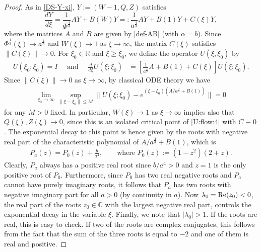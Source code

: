 \documentclass{article}%
\renewcommand{\Re}{{\rm Re}}
\newcommand{\alp}{\alpha}
\newcommand{\lam}{\lambda}
\newcommand{\R}{\mathbb{R}}
\newcommand{\C}{\mathbb{C}}
\begin{document}
\begin{proof}
\medskip

As in \eqref{DS-Y-xi}, $Y := (W-1,Q,Z)$ satisfies
\begin{equation}\label{DS-Y-xi4}
\frac{dY}{d\xi} =\frac{1}{\Phi^{\frac{4}{3}}} AY + B(W)Y 
=: \frac{1}{a^{\frac{4}{3}}} AY + B(1)Y+ C(\xi)Y,
\end{equation}
where the matrices $A$ and $B$ are given by \eqref{def-AB} (with $\alp=b$). Since $\Phi^{\frac{4}{3}}(\xi) \to a^{\frac{4}{3}}$ and $W(\xi) \to 1$ as $\xi\to\infty$, the matrix $C(\xi)$ satisfies $\|C(\xi)\| \to 0$. 
For $\xi_0 \in \R$ and $\xi \geq \xi_0$, we define the operator $U(\xi,\xi_0)$ by
  \begin{align}\label{U:flow:4}
      U(\xi_{0};\xi_{0})=I \quad \text{ and }\quad %
    \frac{d}{d\xi}U(\xi;\xi_{0}) &= 
\left[\frac{1}{a^{\frac{4}{3}}} A +  B(1)+ C(\xi) \right] U(\xi;\xi_{0}).
  \end{align}
  Since $\|C(\xi)\|\to 0$ as $\xi \to \infty$, by classical ODE theory we have
\begin{align*}
  \lim_{\xi_{0}\to\infty}\sup_{\| \xi-\xi_{0}\| \leq M}\| U( \xi;\xi_{0}) -e^{(\xi-\xi_0) (A/a^{\frac{4}{3}}+B(1))}\|    =0
\end{align*}
for any $M>0$ fixed. In particular, $W(\xi)\to 1$ as $\xi\to\infty$ implies also that $Q(\xi),Z(\xi)\to0$, since this is an
isolated critical point of \eqref{U:flow:4} with $C\equiv 0$. The exponential decay to this point is hence given by the roots with negative real part of the characteristic polynomial of $ A/a^{\frac{4}{3}}+B(1)$, which is
\begin{align*}
  P_{a}(z)= P_0(z) +\frac{b}{a^4}, \qquad \text{where $P_0(z) := (1-z^2)(2+z)$.}
\end{align*}
Clearly, $P_{a}$ always has a positive real root since $b/a^4>0$ and $z=1$ is
the only positive root of $P_0$. Furthermore, since $P_0$ has two real negative
roots and $P_a$ cannot have purely imaginary roots, it follows that $P_a$ has
two roots with negative imaginary part for all $a > 0$ (by continuity in
$a$). Now $\lam_0 = \Re(z_0) < 0$, the real part of the roots $z_0 \in \C$ with
the largest negative real part, controls the exponential decay in
the variable $\xi$. Finally, we note that $|\lambda_0|>1$. If the roots are
real, this is easy to check. If two of the roots are complex conjugates, this follows
from the fact that the sum of the three roots is equal to $-2$ and one of them
is real and positive.
\end{proof}

\medskip
\end{document}

